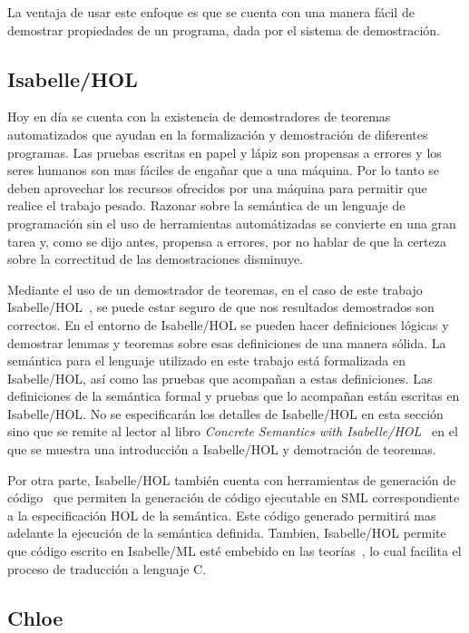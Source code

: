 La ventaja de usar este enfoque es que se cuenta con una manera fácil de demostrar propiedades de un programa, dada por el sistema de demostración.


\subsection{Isabelle/HOL}\label{section:isabelle/hol}

Hoy en día se cuenta con la existencia de demostradores de teoremas automatizados que ayudan en la formalización y demostración de diferentes programas.
Las pruebas escritas en papel y lápiz son propensas a errores y los seres humanos son mas fáciles de engañar que a una máquina.
Por lo tanto se deben aprovechar los recursos ofrecidos por una máquina para permitir que realice el trabajo pesado.
Razonar sobre la semántica de un lenguaje de programación sin el uso de herramientas automátizadas se convierte en una gran tarea y, como se dijo antes, propensa a errores, por no hablar de que la certeza sobre la correctitud de las demostraciones disminuye.

Mediante el uso de un demostrador de teoremas, en el caso de este trabajo Isabelle/HOL~\cite{isabelle-tutorial}, se puede estar seguro de que nos resultados demostrados son correctos.
En el entorno de Isabelle/HOL se pueden hacer definiciones lógicas y demostrar lemmas y teoremas sobre esas definiciones de una manera sólida.
La semántica para el lenguaje utilizado en este trabajo está formalizada en Isabelle/HOL, así como las pruebas que acompañan a estas definiciones.
Las definiciones de la semántica formal y pruebas que lo acompañan están escritas en Isabelle/HOL.
No se especificarán los detalles de Isabelle/HOL en esta sección sino que se remite al lector al libro \textit{Concrete Semantics with Isabelle/HOL}~\cite{nipkow} en el que se muestra una introducción a Isabelle/HOL y demotración de teoremas.

Por otra parte, Isabelle/HOL también cuenta con herramientas de generación de código~\cite{isabelle-codegen} que permiten la generación de código ejecutable en SML correspondiente a la especificación HOL de la semántica.
Este código generado permitirá mas adelante la ejecución de la semántica definida.
Tambien, Isabelle/HOL permite que código escrito en Isabelle/ML esté embebido en las teorías~\cite{isabelle-implementation}, lo cual facilita el proceso de traducción a lenguaje C.

\subsection{Chloe}\label{subsection:chloe}

